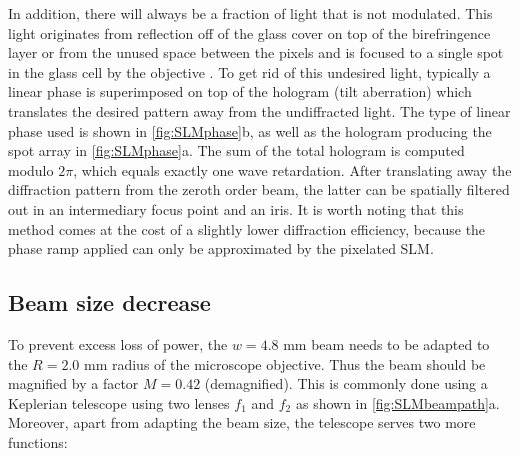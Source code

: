 In addition, there will always be a fraction of light that is not modulated.
This light originates from reflection off of the glass cover on top of the birefringence layer or from the unused space between the pixels and is focused to a single spot in the glass cell by the objective \cite{Bijnen2013}.
To get rid of this undesired light, typically a linear phase is superimposed on top of the hologram (tilt aberration) which translates the desired pattern away from the undiffracted light.
The type of linear phase used is shown in \cref{fig:SLMphase}b, as well as the hologram producing the spot array in \cref{fig:SLMphase}a.
The sum of the total hologram is computed modulo $2\pi$, which equals exactly one wave retardation.
After translating away the diffraction pattern from the zeroth order beam, the latter can be spatially filtered out in an intermediary focus point and an iris. 
It is worth noting that this method comes at the cost of a slightly lower diffraction efficiency, because the phase ramp applied can only be approximated by the pixelated SLM.

\subsection{Beam size decrease}\label{sec:Demagnification}

To prevent excess loss of power, the $w = 4.8$ mm beam needs to be adapted to the $R = 2.0$ mm radius of the microscope objective. 
Thus the beam should be magnified by a factor $M=0.42$ (demagnified).
This is commonly done using a Keplerian telescope using two lenses $f_1$ and $f_2$ as shown in \ref{fig:SLMbeampath}a.
Moreover, apart from adapting the beam size, the telescope serves two more functions:

